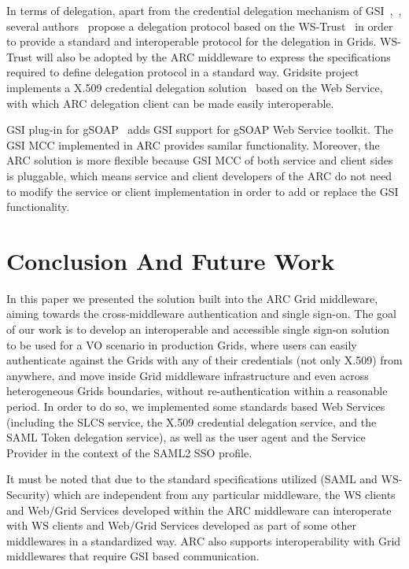 \documentclass[twocolumn]{svjour3}         %
\begin{document}
In terms of delegation, apart from the credential delegation mechanism of GSI~\cite{IFoster98},~\cite{VWelch04}, several authors~\cite{MAhsant04} propose a delegation protocol based on the WS-Trust~\cite{WSTrustlink} in order to provide a standard and interoperable protocol for the delegation in Grids. WS-Trust will also be adopted by the ARC middleware to express the specifications required to define delegation protocol in a standard way. Gridsite project implements a X.509 credential delegation solution~\cite{GridSitelink} based on the Web Service, with which ARC delegation client can be made easily interoperable.

GSI plug-in for gSOAP~\cite{GAloisio05} adds GSI support for gSOAP Web Service toolkit. The GSI MCC implemented in ARC provides samilar functionality. Moreover, the ARC solution is more flexible because GSI MCC of both service and client sides is pluggable, which means service and client developers of the ARC do not need to modify the service or client implementation in order to add or replace the GSI functionality.



\section{Conclusion And Future Work}
\label{sec:conclusion}
In this paper we presented the solution built into the ARC Grid middleware, aiming towards the cross-middleware authentication and single sign-on. The goal of our work is to develop an interoperable and accessible single sign-on solution to be used for a VO scenario in production Grids, where users can easily authenticate against the Grids with any of their credentials (not only X.509) from anywhere, and move inside Grid middleware infrastructure and even across heterogeneous Grids  boundaries, without re-authentication within a reasonable period. In order to do so, we implemented some standards based Web Services (including the SLCS service, the X.509 credential delegation service, and the SAML Token delegation service), as well as the user agent and the Service Provider in the context of the SAML2 SSO profile.

It must be noted that due to the standard specifications utilized (SAML and WS-Security) which are independent from any particular middleware, the WS clients and Web/Grid Services developed within the ARC middleware can interoperate with WS clients and Web/Grid Services developed as part of some other middlewares in a standardized way. ARC also supports interoperability with Grid middlewares that require GSI based communication.
\end{document}
